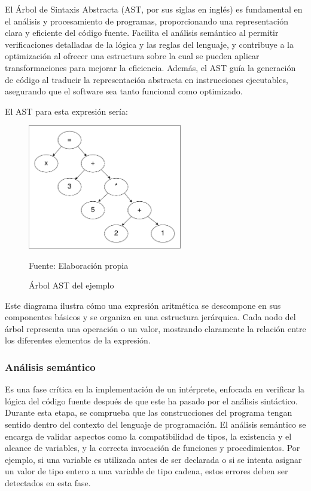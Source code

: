 El Árbol de Sintaxis Abstracta (AST, por sus siglas en inglés) es fundamental en el análisis y procesamiento de programas, proporcionando una representación clara y eficiente del código fuente. Facilita el análisis semántico al permitir verificaciones detalladas de la lógica y las reglas del lenguaje, y contribuye a la optimización al ofrecer una estructura sobre la cual se pueden aplicar transformaciones para mejorar la eficiencia. Además, el AST guía la generación de código al traducir la representación abstracta en instrucciones ejecutables, asegurando que el software sea tanto funcional como optimizado.

El AST para esta expresión sería:

\begin{figure}[!h]
  \centering
  \includegraphics[width=0.6\textwidth]{images/ast_ejemplo.png}
  \caption{Árbol AST del ejemplo}
  \centering Fuente: Elaboración propia
  \label{fig:ast_ejemplo}
\end{figure}
\newpage

Este diagrama ilustra cómo una expresión aritmética se descompone en sus componentes básicos y se organiza en una estructura jerárquica. Cada nodo del árbol representa una operación o un valor, mostrando claramente la relación entre los diferentes elementos de la expresión.

\subsubsection{Análisis semántico}
Es una fase crítica en la implementación de un intérprete, enfocada en verificar la lógica del código fuente después de que este ha pasado por el análisis sintáctico. Durante esta etapa, se comprueba que las construcciones del programa tengan sentido dentro del contexto del lenguaje de programación. El análisis semántico se encarga de validar aspectos como la compatibilidad de tipos, la existencia y el alcance de variables, y la correcta invocación de funciones y procedimientos. Por ejemplo, si una variable es utilizada antes de ser declarada o si se intenta asignar un valor de tipo entero a una variable de tipo cadena, estos errores deben ser detectados en esta fase.


